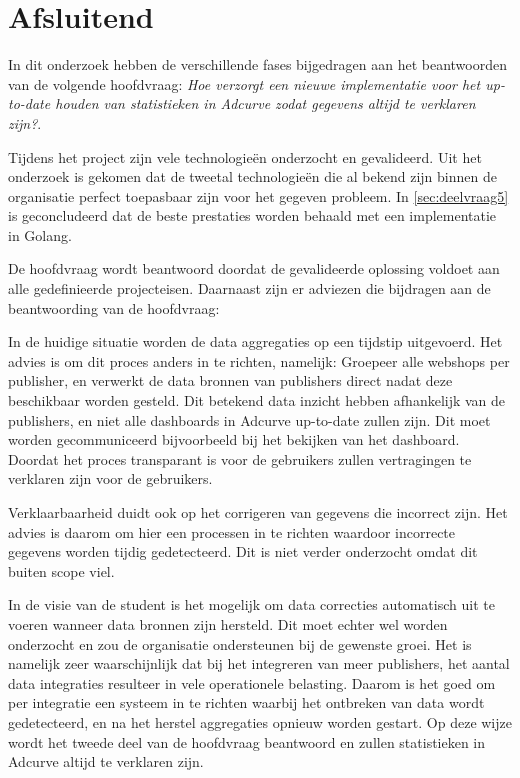 \chapter{Afsluitend}

In dit onderzoek hebben de verschillende fases bijgedragen aan het beantwoorden van de volgende hoofdvraag: \textit{Hoe verzorgt een nieuwe implementatie voor het up-to-date houden van statistieken in Adcurve zodat gegevens altijd te verklaren zijn?}.

Tijdens het project zijn vele technologieën onderzocht en gevalideerd. Uit het onderzoek is gekomen dat de tweetal technologieën die al bekend zijn binnen de organisatie perfect toepasbaar zijn voor het gegeven probleem. In \ref{sec:deelvraag5} is geconcludeerd dat de beste prestaties worden behaald met een implementatie in Golang.

De hoofdvraag wordt beantwoord doordat de gevalideerde oplossing voldoet aan alle gedefinieerde projecteisen. Daarnaast zijn er adviezen die bijdragen aan de beantwoording van de hoofdvraag:

In de huidige situatie worden de data aggregaties op een tijdstip uitgevoerd. Het advies is om dit proces anders in te richten, namelijk:
Groepeer alle webshops per publisher, en verwerkt de data bronnen van publishers direct nadat deze beschikbaar worden gesteld. Dit betekend data inzicht hebben afhankelijk van de publishers, en niet alle dashboards in Adcurve up-to-date zullen zijn. Dit moet worden gecommuniceerd bijvoorbeeld bij het bekijken van het dashboard. Doordat het proces transparant is voor de gebruikers zullen vertragingen te verklaren zijn voor de gebruikers.

Verklaarbaarheid duidt ook op het corrigeren van gegevens die incorrect zijn. Het advies is daarom om hier een processen in te richten waardoor incorrecte gegevens worden tijdig gedetecteerd. Dit is niet verder onderzocht omdat dit buiten scope viel.

In de visie van de student is het mogelijk om data correcties automatisch uit te voeren wanneer data bronnen zijn hersteld. Dit moet echter wel worden onderzocht en zou de organisatie ondersteunen bij de gewenste groei. Het is namelijk zeer waarschijnlijk dat bij het integreren van meer publishers, het aantal data integraties resulteer in vele operationele belasting. Daarom is het goed om per integratie een systeem in te richten waarbij het ontbreken van data wordt gedetecteerd, en na het herstel aggregaties opnieuw worden gestart. 
Op deze wijze wordt het tweede deel van de hoofdvraag beantwoord en zullen statistieken in Adcurve altijd te verklaren zijn. 


